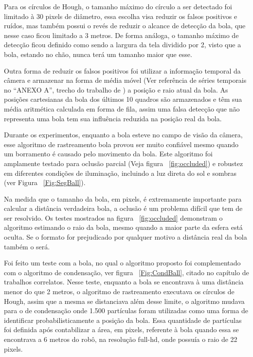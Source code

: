 Para os círculos de Hough, o tamanho máximo do círculo a ser detectado foi limitado à 30 pixels de diâmetro, essa escolha visa reduzir os falsos positivos e ruídos, mas também possui o revés de reduzir o alcance de detecção da bola, que nesse caso ficou limitado a 3 metros. De forma análoga, o tamanho máximo de detecção ficou definido como sendo a largura da tela dividido por 2, visto que a bola, estando no chão, nunca terá um tamanho maior que esse.

Outra forma de reduzir os falsos positivos foi utilizar a informação temporal da câmera e armazenar na forma de média móvel (Ver referência de séries temporais no “ANEXO A”, trecho do trabalho de ) a posição e raio atual da bola. As posições cartesianas da bola dos últimos 10 quadros são armazenados e têm sua média aritmética calculada em forma de fila, assim uma falsa detecção que não representa uma bola tem sua influência reduzida na posição real da bola. 

Durante os experimentos, enquanto a bola esteve no campo de visão da câmera, esse algoritmo de rastreamento bola provou ser muito confiável mesmo quando um borramento é causado pelo movimento da bola. Este algoritmo foi amplamente testado para oclusão parcial (Veja figura ~\ref{fig:occluded}) e robustez em diferentes condições de iluminação, incluindo a luz direta do sol e sombras (ver Figura ~\ref{Fig:SegBall}).

Na medida que o tamanho da bola, em pixels, é extremamente importante para calcular a distância verdadeira bola, a oclusão é um problema difícil que tem de ser resolvido. Os testes mostrados na figura ~\ref{fig:occluded} demonstram o algoritmo estimando o raio da bola, mesmo quando a maior parte da esfera está oculta. Se o formato for prejudicado por qualquer motivo a distância real da bola também o será. 

Foi feito um teste com a bola, no qual o algoritmo proposto foi complementado com o algoritmo de condensação, ver figura ~\ref{Fig:CondBall}, citado no capítulo de trabalhos correlatos. Nesse teste, enquanto a bola se encontrava à uma distância menor do que 2 metros, o algoritmo de rastreamento executava os círculos de Hough, assim que a mesma se distanciava além desse limite, o algoritmo mudava para o de condensação onde 1.500 partículas foram utilizadas como uma forma de identificar probabilisticamente a posição da bola. Essa quantidade de partículas foi definida após contabilizar a área, em pixels, referente à bola quando essa se encontrava a 6 metros do robô, na resolução full-hd, onde possuía o raio de 22 pixels.

